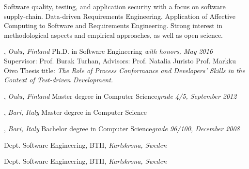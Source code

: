 \documentclass[9pt]{article}
\begin{document}
\noindent Software quality, testing, and application security with a focus on software supply-chain. Data-driven Requirements Engineering. Application of Affective Computing to Software and Requirements Engineering.
Strong interest in methodological aspects and empirical approaches, as well as open science.
\bigskip
\medskip



, \emph{Oulu, Finland} \vspace{0.01in} 
\newline Ph.D. in Software Engineering {\em with honors, May 2016}
\newline Supervisor: Prof. Burak Turhan, Advisors: Prof. Natalia Juristo \amper{} Prof. Markku Oivo
\newline Thesis title: {\em The Role of Process Conformance and Developers' Skills in the Context of Test-driven Development.}

\bigskip


, \emph{Oulu, Finland} \vspace{0.01in}  
\newline\noindent Master degree in Computer Science{\em grade 4/5, September 2012}

\bigskip

, \emph{Bari, Italy} \vspace{0.01in}  
\newline\noindent Master degree in Computer Science


\bigskip

, \emph{Bari, Italy} \vspace{0.01in}  
\newline\noindent Bachelor degree in Computer Science{\em grade 96/100, December 2008}

\bigskip
\medskip
{}
\noindent Dept. Software Engineering, BTH, \emph{Karlskrona, Sweden} \vspace{0.01in} 
\newline{}
\bigskip

\noindent Dept. Software Engineering, BTH, \emph{Karlskrona, Sweden} \vspace{0.01in} 
\newline{}
\bigskip
\end{document}
